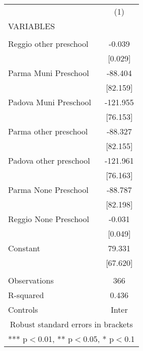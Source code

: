 \begin{tabular}{lc} \hline
 & (1) \\
VARIABLES &  \\ \hline
 &  \\
Reggio other preschool & -0.039 \\
 & [0.029] \\
Parma Muni Preschool & -88.404 \\
 & [82.159] \\
Padova Muni Preschool & -121.955 \\
 & [76.153] \\
Parma other preschool & -88.327 \\
 & [82.155] \\
Padova other preschool & -121.961 \\
 & [76.163] \\
Parma None Preschool & -88.787 \\
 & [82.198] \\
Reggio None Preschool & -0.031 \\
 & [0.049] \\
Constant & 79.331 \\
 & [67.620] \\
 &  \\
Observations & 366 \\
R-squared & 0.436 \\
 Controls & Inter \\ \hline
\multicolumn{2}{c}{ Robust standard errors in brackets} \\
\multicolumn{2}{c}{ *** p$<$0.01, ** p$<$0.05, * p$<$0.1} \\
\end{tabular}
